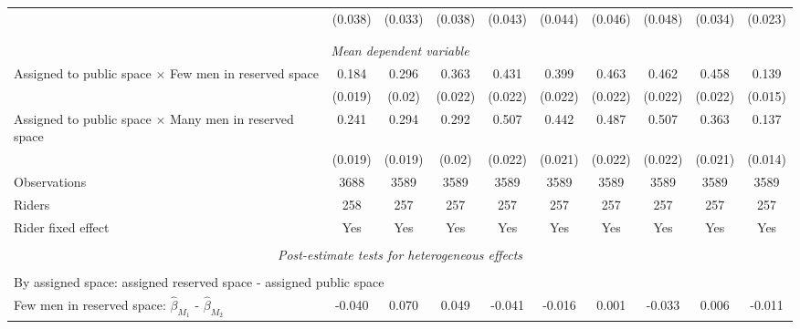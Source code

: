 \begin{tabular}{l*{9}{c}}
                    &     (0.038)         &     (0.033)         &     (0.038)         &     (0.043)         &     (0.044)         &     (0.046)         &     (0.048)         &     (0.034)         &     (0.023)         \\
\\[-1.8ex] \hline \\[-1.8ex]  
\multicolumn{10}{c}{\textit{Mean dependent variable}} \\ Assigned to public space $\times$ Few men in reserved space&       0.184         &       0.296         &       0.363         &       0.431         &       0.399         &       0.463         &       0.462         &       0.458         &       0.139         \\
\,                  &     (0.019)         &      (0.02)         &     (0.022)         &     (0.022)         &     (0.022)         &     (0.022)         &     (0.022)         &     (0.022)         &     (0.015)         \\
Assigned to public space $\times$ Many men in reserved space&       0.241         &       0.294         &       0.292         &       0.507         &       0.442         &       0.487         &       0.507         &       0.363         &       0.137         \\
\,                  &     (0.019)         &     (0.019)         &      (0.02)         &     (0.022)         &     (0.021)         &     (0.022)         &     (0.022)         &     (0.021)         &     (0.014)         \\
Observations        &        3688         &        3589         &        3589         &        3589         &        3589         &        3589         &        3589         &        3589         &        3589         \\
Riders              &         258         &         257         &         257         &         257         &         257         &         257         &         257         &         257         &         257         \\
Rider fixed effect  &         Yes         &         Yes         &         Yes         &         Yes         &         Yes         &         Yes         &         Yes         &         Yes         &         Yes         \\
\hline \\[-1ex]  \multicolumn{10}{c}{\textit{Post-estimate tests for heterogeneous effects}} \\\\[-1ex] \multicolumn{10}{l}{By assigned space: assigned reserved space - assigned public space} \\ \quad Few men in reserved space: $\hat\beta_{M_1}$ - $\hat\beta_{M_2}$&      -0.040         &       0.070         &       0.049         &      -0.041         &      -0.016         &       0.001         &      -0.033         &       0.006         &      -0.011         \\

\end{tabular}

